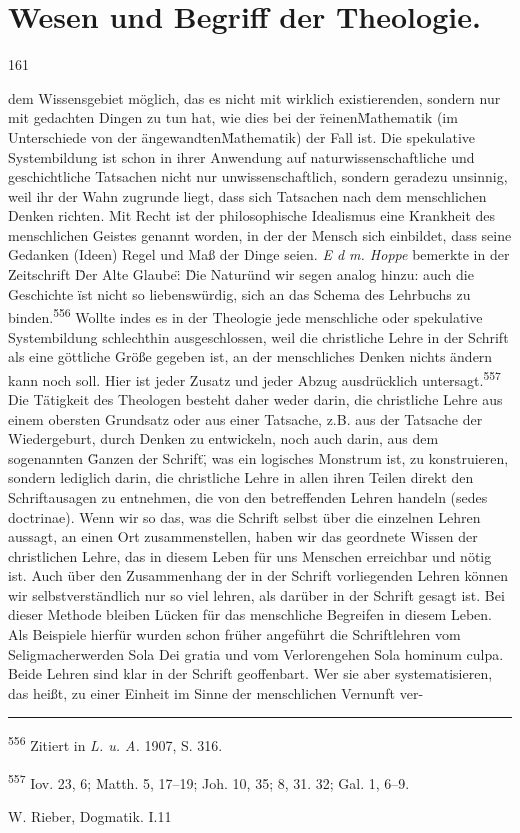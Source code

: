 \section*{Wesen und Begriff der Theologie.}\hfill 161\par\parauf dem Wissensgebiet möglich, das es nicht mit wirklich existierenden, sondern nur mit gedachten Dingen zu tun hat, wie dies bei der \"reinen\" Mathematik (im Unterschiede von der \"angewandten\" Mathematik) der Fall ist. Die spekulative Systembildung ist schon in ihrer Anwendung auf naturwissenschaftliche und geschichtliche Tatsachen nicht nur unwissenschaftlich, sondern geradezu unsinnig, weil ihr der Wahn zugrunde liegt, dass sich Tatsachen nach dem menschlichen Denken richten. Mit Recht ist der philosophische Idealismus eine Krankheit des menschlichen Geistes genannt worden, in der der Mensch sich einbildet, dass seine Gedanken (Ideen) Regel und Maß der Dinge seien. \emph{E d m. Hoppe} bemerkte in der Zeitschrift \"Der Alte Glaube\": \"Die Natur\" und wir segen analog hinzu: auch die Geschichte \"ist nicht so liebenswürdig, sich an das Schema des Lehrbuchs zu binden.\"\textsuperscript{556} Wollte indes es in der Theologie jede menschliche oder spekulative Systembildung schlechthin ausgeschlossen, weil die christliche Lehre in der Schrift als eine göttliche Größe gegeben ist, an der menschliches Denken nichts ändern kann noch soll. Hier ist jeder Zusatz und jeder Abzug ausdrücklich untersagt.\textsuperscript{557} Die Tätigkeit des Theologen besteht daher weder darin, die christliche Lehre aus einem obersten Grundsatz oder aus einer Tatsache, z.B. aus der Tatsache der Wiedergeburt, durch Denken zu entwickeln, noch auch darin, aus dem sogenannten \"Ganzen der Schrift\", was ein logisches Monstrum ist, zu konstruieren, sondern lediglich darin, die christliche Lehre in allen ihren Teilen direkt den Schriftausagen zu entnehmen, die von den betreffenden Lehren handeln (sedes doctrinae). Wenn wir so das, was die Schrift selbst über die einzelnen Lehren aussagt, an einen Ort zusammenstellen, haben wir das geordnete Wissen der christlichen Lehre, das in diesem Leben für uns Menschen erreichbar und nötig ist. Auch über den Zusammenhang der in der Schrift vorliegenden Lehren können wir selbstverständlich nur so viel lehren, als darüber in der Schrift gesagt ist. Bei dieser Methode bleiben Lücken für das menschliche Begreifen in diesem Leben. Als Beispiele hierfür wurden schon früher angeführt die Schriftlehren vom Seligmacherwerden Sola Dei gratia und vom Verlorengehen Sola hominum culpa. Beide Lehren sind klar in der Schrift geoffenbart. Wer sie aber systematisieren, das heißt, zu einer Einheit im Sinne der menschlichen Vernunft ver-\par\vspace{1em}\hrule\begin{footnotesize}\par\vspace{0.5em}\noindent\textsuperscript{556} Zitiert in \emph{L. u. A.} 1907, S. 316.\par\noindent\textsuperscript{557} Iov. 23, 6; Matth. 5, 17--19; Joh. 10, 35; 8, 31. 32; Gal. 1, 6--9.\par\noindent W. Rieber, Dogmatik. I.\hfill 11\end{footnotesize}